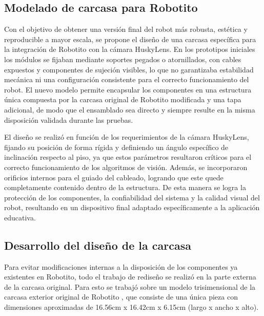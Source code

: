 \documentclass{prgrado}
\begin{document}
\begin{appendix}

\chapter{Modelado de carcasa para Robotito}

Con el objetivo de obtener una versión final del robot más robusta, estética y reproducible a mayor escala, se propone el diseño de una carcasa específica para la integración de Robotito con la cámara HuskyLens. En los prototipos iniciales los módulos se fijaban mediante soportes pegados o atornillados, con cables expuestos y componentes de sujeción visibles, lo que no garantizaba estabilidad mecánica ni una configuración consistente para el correcto funcionamiento del robot. El nuevo modelo permite encapsular los componentes en una estructura única compuesta por la carcasa original de Robotito modificada y una tapa adicional, de modo que el ensamblado sea directo y siempre resulte en la misma disposición validada durante las pruebas.

El diseño se realizó en función de los requerimientos de la cámara HuskyLens, fijando su posición de forma rígida y definiendo un ángulo específico de inclinación respecto al piso, ya que estos parámetros resultaron críticos para el correcto funcionamiento de los algoritmos de visión. Además, se incorporaron orificios internos para el guiado del cableado, logrando que este quede completamente contenido dentro de la estructura. De esta manera se logra la protección de los componentes, la confiabilidad del sistema y la calidad visual del robot, resultando en un dispositivo final adaptado específicamente a la aplicación educativa.

\section{Desarrollo del diseño de la carcasa}

Para evitar modificaciones internas a la disposición de los componentes ya existentes en Robotito, todo el trabajo de rediseño se realizó en la parte externa de la carcasa original. Para esto se trabajó sobre un modelo trisimensional de la carcasa exterior original de Robotito \cite{CarcasaRobotito}, que consiste de una única pieza con dimensiones aproximadas de 16.56cm x 16.42cm x 6.15cm (largo x ancho x alto).

\begin{figure}[htbp]
    \centering


\end{figure}
\end{appendix}
\end{document}
